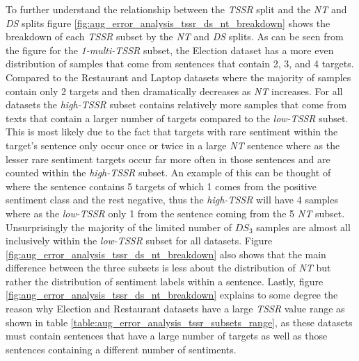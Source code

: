 To further understand the relationship between the \textit{TSSR} split and the \textit{NT} and \textit{DS} splits figure \ref{fig:aug_error_analysis_tssr_ds_nt_breakdown} shows the breakdown of each \textit{TSSR} subset by the \textit{NT} and \textit{DS} splits. As can be seen from the figure for the \textit{1-multi-TSSR} subset, the Election dataset has a more even distribution of samples that come from sentences that contain 2, 3, and 4 targets. Compared to the Restaurant and Laptop datasets where the majority of samples contain only 2 targets and then dramatically decreases as \textit{NT} increases. For all datasets the \textit{high-TSSR} subset contains relatively more samples that come from texts that contain a larger number of targets compared to the \textit{low-TSSR} subset. This is most likely due to the fact that targets with rare sentiment within the target's sentence only occur once or twice in a large \textit{NT} sentence where as the lesser rare sentiment targets occur far more often in those sentences and are counted within the \textit{high-TSSR} subset. An example of this can be thought of where the sentence contains 5 targets of which 1 comes from the positive sentiment class and the rest negative, thus the \textit{high-TSSR} will have 4 samples where as the \textit{low-TSSR} only 1 from the sentence coming from the 5 \textit{NT} subset. Unsurprisingly the majority of the limited number of $DS_3$ samples are almost all inclusively within the \textit{low-TSSR} subset for all datasets. Figure \ref{fig:aug_error_analysis_tssr_ds_nt_breakdown} also shows that the main difference between the three subsets is less about the distribution of \textit{NT} but rather the distribution of sentiment labels within a sentence. Lastly, figure \ref{fig:aug_error_analysis_tssr_ds_nt_breakdown} explains to some degree the reason why Election and Restaurant datasets have a large \textit{TSSR} value range as shown in table \ref{table:aug_error_analysis_tssr_subsets_range}, as these datasets must contain sentences that have a large number of targets as well as those sentences containing a different number of sentiments. 

